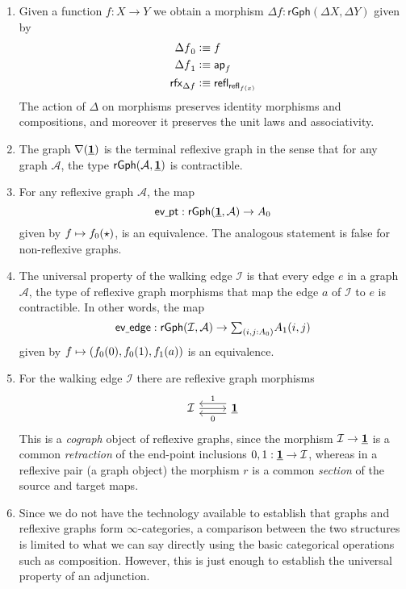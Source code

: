 \begin{eg}\label{eg:rgraph_morphism}
\begin{enumerate}
\item Given a function $f:X\to Y$ we obtain a morphism $\Delta f:\mathsf{rGph}(\Delta X,\Delta Y)$ given by
\begin{align*}
\pts{\Delta f} & \defeq f \\
\edg{\Delta f} & \defeq \apfunc{f} \\
\rfx{\Delta f} & \defeq \refl{\refl{f(x)}}
\end{align*}
The action of $\Delta$ on morphisms preserves identity morphisms and compositions, and moreover it preserves the unit laws and associativity. 
\item The graph $\nabla(\underline{\mathbf{1}})$ is the terminal reflexive graph in the sense that for any graph $\mathcal{A}$, the type $\mathsf{rGph}(\mathcal{A},\underline{\mathbf{1}})$ is contractible.
\item For any reflexive graph $\mathcal{A}$, the map 
\begin{equation*}
\mathsf{ev\usc{}pt}:\mathsf{rGph}(\unit,\mathcal{A})\to\pts{A}
\end{equation*}
given by $f\mapsto \pts{f}(\ttt)$, is an equivalence. The analogous statement is false for non-reflexive graphs.
\item The universal property of the walking edge $\mathcal{I}$ is that every edge $e$ in a graph $\mathcal{A}$, the type of reflexive graph morphisms that map the edge $a$ of $\mathcal{I}$ to $e$ is contractible. In other words, the map
\begin{equation*}
\mathsf{ev\usc{}edge} : \mathsf{rGph}(\mathcal{I},\mathcal{A})\to \sm{i,j:\pts{A}}\edg{A}(i,j)
\end{equation*}
given by $f\mapsto (\pts{f}(0),\pts{f}(1),\edg{f}(a))$ is an equivalence.
\item For the walking edge $\mathcal{I}$ there are reflexive graph morphisms
\begin{equation*}
\begin{tikzcd}
\mathcal{I} \arrow[r] & \unit \arrow[l,yshift=1ex,swap,"1"] \arrow[l,yshift=-1ex,"0"]
\end{tikzcd}
\end{equation*}
This is a \emph{cograph} object of reflexive graphs, since the morphism $\mathcal{I}\to\underline{\mathbf{1}}$ is a common \emph{retraction} of the end-point inclusions $0,1:\underline{\mathbf{1}}\to \mathcal{I}$, whereas in a reflexive pair (a graph object) the morphism $r$ is a common \emph{section} of the source and target maps.
\item \label{eg:freerfx} Since we do not have the technology available to establish that graphs and reflexive graphs form $\infty$-categories, a comparison between the two structures is limited to what we can say directly using the basic categorical operations such as composition. However, this is just enough to establish the universal property of an adjunction.


\end{enumerate}
\end{eg}
